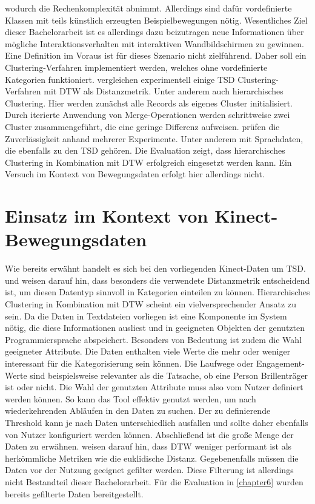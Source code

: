 wodurch die Rechenkomplexität abnimmt.
Allerdings sind dafür vordefinierte Klassen mit teils künstlich erzeugten Beispielbewegungen nötig.
Wesentliches Ziel dieser Bachelorarbeit ist es allerdings dazu beizutragen neue Informationen
über mögliche Interaktionsverhalten mit interaktiven Wandbildschirmen zu gewinnen.
Eine Definition im Voraus ist für dieses Szenario nicht zielführend.
Daher soll ein Clustering-Verfahren implementiert werden,
welches ohne vordefinierte Kategorien funktioniert.
\citet{hautamaki_time-series_2008} vergleichen experimentell einige \ac*{TSD} Clustering-Verfahren
mit \ac{DTW} als Distanzmetrik.
Unter anderem auch hierarchisches Clustering.
Hier werden zunächst alle Records als eigenes Cluster initialisiert.
Durch iterierte Anwendung von Merge-Operationen werden schrittweise zwei Cluster zusammengeführt,
die eine geringe Differenz aufweisen.
\citet{hautamaki_time-series_2008} prüfen die Zuverlässigkeit anhand mehrerer Experimente.
Unter anderem mit Sprachdaten, die ebenfalls zu den \ac{TSD} gehören.
Die Evaluation zeigt, dass hierarchisches Clustering in Kombination mit \ac{DTW} erfolgreich eingesetzt werden kann.
Ein Versuch im Kontext von Bewegungsdaten erfolgt hier allerdings nicht.

\section{Einsatz im Kontext von Kinect-Bewegungsdaten}
\label{3-Einsatz}
Wie bereits erwähnt handelt es sich bei den vorliegenden Kinect-Daten um \ac{TSD}.
\citet{warren_liao_clustering_2005} und \citet{aghabozorgi_time-series_2015} weisen darauf hin,
dass besonders die verwendete Distanzmetrik entscheidend ist,
um diesen Datentyp sinnvoll in Kategorien einteilen zu können.
Hierarchisches Clustering in Kombination mit \ac{DTW} scheint ein vielversprechender Ansatz zu sein.
Da die Daten in Textdateien vorliegen ist eine Komponente im System nötig,
die diese Informationen ausliest und in geeigneten Objekten der genutzten Programmiersprache abspeichert.
Besonders von Bedeutung ist zudem die Wahl geeigneter Attribute.
Die Daten enthalten viele Werte die mehr oder weniger interessant für die Kategorisierung sein können.
Die Laufwege oder Engagement-Werte sind beispielsweise relevanter als die Tatsache,
ob eine Person Brillenträger ist oder nicht.
Die Wahl der genutzten Attribute muss also vom Nutzer definiert werden können.
So kann das Tool effektiv genutzt werden, um nach wiederkehrenden Abläufen in den Daten zu suchen.
Der zu definierende Threshold kann je nach Daten unterschiedlich ausfallen
und sollte daher ebenfalls von Nutzer konfiguriert werden können.
Abschließend ist die große Menge der Daten zu erwähnen.
\citet{aghabozorgi_time-series_2015} weisen darauf hin,
dass \ac{DTW} weniger performant ist als herkömmliche Metriken wie die euklidische Distanz.
Gegebenenfalls müssen die Daten vor der Nutzung geeignet gefilter werden.
Diese Filterung ist allerdings nicht Bestandteil dieser Bachelorarbeit.
Für die Evaluation in \autoref{chapter6} wurden bereits gefilterte Daten bereitgestellt.